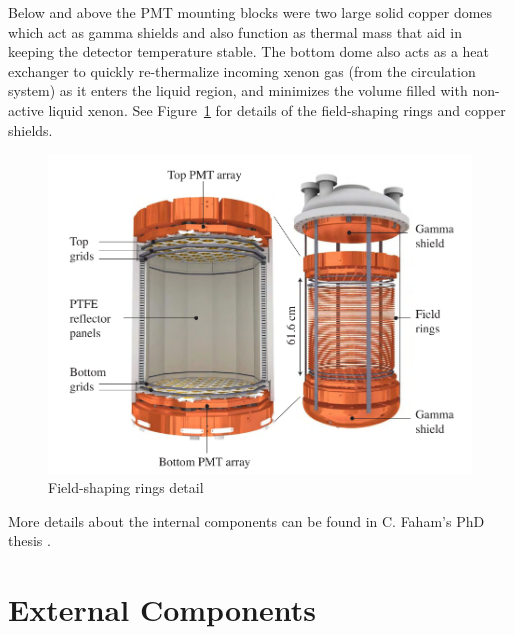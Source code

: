 Below and above the \ac{PMT} mounting blocks were two large solid copper domes which act as gamma shields and also function as thermal mass that aid in keeping the detector temperature stable. The bottom dome also acts as a heat exchanger to quickly re-thermalize incoming xenon gas (from the circulation system) as it enters the liquid region, and minimizes the volume filled with non-active liquid xenon. See Figure~\ref{fig:lux2} for details of the field-shaping rings and copper shields.

\begin{figure}[htbp]
\begin{center}
\includegraphics[width=\textwidth]{figures/lux/lux_inner2.png}
\caption{Field-shaping rings detail}
\label{fig:lux2}
\end{center}
\end{figure}


More details about the internal components can be found in C. Faham's PhD thesis \cite{Faham2014a}.

\section{External Components}


